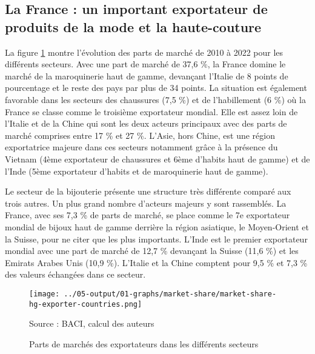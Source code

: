 \documentclass[french,10pt,a4paper]{article}
\begin{document}
\subsection{La France : un important exportateur de produits de la mode et la haute-couture}

La figure \ref{fig:market-share} montre l'évolution des parts de marché de 2010 à 2022 pour les différents secteurs. Avec une part de marché de 37,6 \%, la France domine le marché de la maroquinerie haut de gamme, devançant l'Italie de 8 points de pourcentage et le reste des pays par plus de 34 points. La situation est également favorable dans les secteurs des chaussures (7,5 \%) et de l'habillement (6 \%) où la France se classe comme le troisième exportateur mondial. Elle est assez loin de l'Italie et de la Chine qui sont les deux acteurs principaux avec des parts de marché comprises entre 17 \% et 27 \%. L'Asie, hors Chine, est une région exportatrice majeure dans ces secteurs notamment grâce à la présence du Vietnam (4ème exportateur de chaussures et 6ème d'habits haut de gamme) et de l'Inde (5ème exportateur d'habits et de maroquinerie haut de gamme). 


Le secteur de la bijouterie présente une structure très différente comparé aux trois autres. Un plus grand nombre d'acteurs majeurs y sont rassemblés. La France, avec ses 7,3 \% de parts de marché, se place comme le 7e exportateur mondial de bijoux haut de gamme derrière la région asiatique, le Moyen-Orient et la Suisse, pour ne citer que les plus importants. L'Inde est le premier exportateur mondial avec une part de marché de 12,7 \% devançant la Suisse (11,6 \%) et les Emirats Arabes Unis (10,9 \%). L'Italie et la Chine comptent pour 9,5 \% et 7,3 \% des valeurs échangées dans ce secteur.

\begin{figure}[!h]
  \centering
  \texttt{[image: ../05-output/01-graphs/market-share/market-share-hg-exporter-countries.png]}
  \captionsetup{justification=raggedright,singlelinecheck=false, font=small}
  \caption*{Source : BACI, calcul des auteurs}
  \captionsetup{justification=centering, singlelinecheck=true, font=normalsize}
  \caption{Parts de marchés des exportateurs dans les différents secteurs}
  \label{fig:market-share}
\end{figure}

\bigskip
\end{document}
